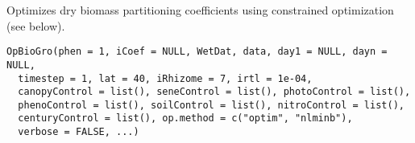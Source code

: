 \documentclass[letterpaper]{book}
\begin{document}
%
\begin{Description}\relax
Optimizes dry biomass partitioning coefficients using
constrained optimization (see below).
\end{Description}
%
\begin{Usage}
\begin{verbatim}
OpBioGro(phen = 1, iCoef = NULL, WetDat, data, day1 = NULL, dayn = NULL,
  timestep = 1, lat = 40, iRhizome = 7, irtl = 1e-04,
  canopyControl = list(), seneControl = list(), photoControl = list(),
  phenoControl = list(), soilControl = list(), nitroControl = list(),
  centuryControl = list(), op.method = c("optim", "nlminb"),
  verbose = FALSE, ...)
\end{verbatim}
\end{Usage}
%
\end{document}
